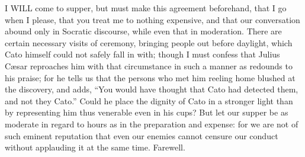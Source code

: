 
I WILL come to supper, but must make this agreement beforehand, that I go
when I please, that you treat me to nothing expensive, and that our
conversation abound only in Socratic discourse, while even that in
moderation. There are certain necessary visits of ceremony, bringing
people out before daylight, which Cato himself could not safely fall in
with; though I must confess that Julius Cæsar reproaches him with that
circumstance in such a manner as redounds to his praise; for he tells us
that the persons who met him reeling home blushed at the discovery, and
adds, ``You would have thought that Cato had detected them, and not they
Cato.'' Could he place the dignity of Cato in a stronger light than by
representing him thus venerable even in his cups? But let our supper be as
moderate in regard to hours as in the preparation and expense: for we are
not of such eminent reputation that even our enemies cannot censure our
conduct without applauding it at the same time. Farewell.


